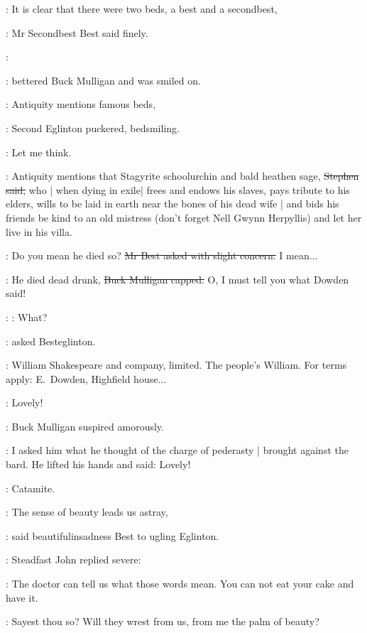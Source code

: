 \best:
It is clear that there were two beds,
a best and a secondbest,

:
Mr Secondbest Best said finely.

\mulligan:

:
bettered Buck Mulligan and was smiled on.

\eglinton:
Antiquity mentions famous beds,

:
Second Eglinton puckered, bedsmiling.

\eglinton:
Let me think.

\Stephen:
Antiquity mentions
that Stagyrite schoolurchin and bald heathen sage,
\sout{Stephen said,}
who |
when dying in exile|
frees and endows his slaves,
pays tribute to his elders,
wills to be laid in earth near the bones of his dead wife |
and bids his friends be kind to an old mistress
(don't forget Nell Gwynn Herpyllis)
and let her live in his villa.

\best:
Do you mean he died so?
\sout{Mr Best asked with slight concern.}
I mean...

\mulligan:
He died dead drunk,
\sout{Buck Mulligan capped.}
O, I must tell you what Dowden said!

\best:
\eglinton:
What?

:
asked Besteglinton.

\StephenInt:
William Shakespeare and company, limited.
The people's William.
For terms apply:
E.~Dowden,
Highfield house...

\mulligan:
Lovely!

:
Buck Mulligan suspired amorously.

\mulligan:
I asked him what he thought
of the charge of pederasty |
brought against the bard.
He lifted his hands and said:
Lovely!

\StephenInt:
Catamite.

\best:
The sense of beauty leads us astray,

:
said beautifulinsadness Best to ugling Eglinton.

:
Steadfast John replied severe:

\eglinton:
The doctor can tell us what those words mean.
You can not eat your cake and have it.

\StephenInt:
Sayest thou so?
Will they wrest from us,
from me the palm of beauty?

